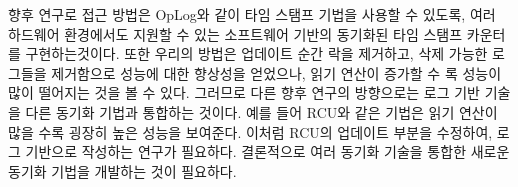 향후 연구로 접근 방법은 OpLog와 같이 타임 스탬프 기법을 사용할 수 있도록, 
여러 하드웨어 환경에서도 지원할 수 있는 소프트웨어 기반의 동기화된 타임 스탬프 카운터를 구현하는것이다.
또한 우리의 방법은 업데이트 순간 락을 제거하고, 삭제 가능한 로그들을 제거함으로 
성능에 대한 향상성을 얻었으나, 읽기 연산이 증가할 수 록 성능이 많이 떨어지는 것을 볼 수 있다.
그러므로 다른 향후 연구의 방향으로는 로그 기반 기술을 다른 동기화 기법과 통합하는 것이다. 
예를 들어 RCU와 같은 기법은 읽기 연산이 많을 수록 굉장히 높은 성능을 보여준다.
이처럼 RCU의 업데이트 부분을 수정하여, 로그 기반으로 작성하는 연구가 필요하다.
결론적으로 여러 동기화 기술을 통합한 새로운 동기화 기법을 개발하는 것이 필요하다.

